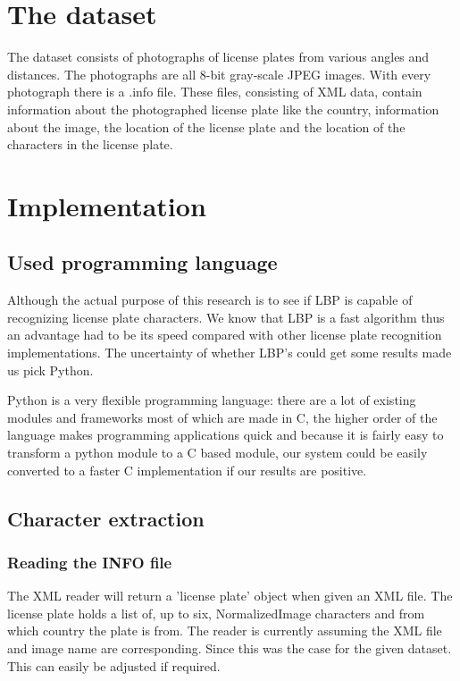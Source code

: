 \documentclass[a4paper]{article}
\begin{document}
\section{The dataset}

The dataset consists of photographs of license plates from various angles and
distances. The photographs are all 8-bit gray-scale JPEG images. With every
photograph there is a .info file. These files, consisting of XML data, contain
information about the photographed license plate like the country, information
about the image, the location of the license plate and the location of the
characters in  the license plate.


\section{Implementation}


\subsection{Used programming language}

Although the actual purpose of this research is to see if LBP is capable of
recognizing license plate characters. We know that LBP is a fast algorithm thus
an advantage had to be its speed compared with other license plate recognition
implementations. The uncertainty of whether LBP's could get some results made us
pick Python.

Python is a very flexible programming language: there are a lot of existing
modules and frameworks most of which are made in C, the higher order of the
language makes programming applications quick and because it is fairly easy to
transform a python module to a C based module, our system could be easily
converted to a faster C implementation if our results are positive.


\subsection{Character extraction}


\subsubsection{Reading the INFO file}

The XML reader will return a 'license plate' object when given an XML file. The
license plate holds a list of, up to six, NormalizedImage characters and from
which country the plate is from. The reader is currently assuming the XML file
and image name are corresponding. Since this was the case for the given dataset.
This can easily be adjusted if required.
\end{document}

